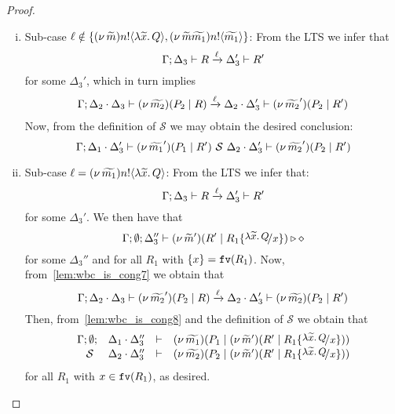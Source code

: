 \begin{proof}
\begin{enumerate}[I.]
\begin{enumerate}[1.]
				\begin{enumerate}[i.]
					\item Sub-case 	$\ell \notin \{(\nu\, \widetilde{m}) n ! \langle \lambda \widetilde{x}.\,Q \rangle, (\nu\, \widetilde{m}\widetilde{m_1}) n ! \langle \widetilde{m_1} \rangle\}$: From the LTS we infer that 
							\[
								\Gamma; \Delta_3 \vdash R \xrightarrow{\ell} \Delta_3' \vdash R'
							\]
						for some $\Delta_3'$, which in turn implies
							\begin{eqnarray*}
								\Gamma; \Delta_2 \cdot \Delta_3 \vdash (\nu\, \widetilde{m_2})(P_2 \;|\; R) \xrightarrow{\ell} \Delta_2 \cdot \Delta_3' \vdash (\nu\, \widetilde{m_2}')(P_2 \;|\; R')
							\end{eqnarray*}
						Now, from the definition of $\mathcal{S}$ we may obtain the desired conclusion:
							\[
								\Gamma; \Delta_1 \cdot \Delta_3' \vdash (\nu\, \widetilde{m_1}')(P_1 \;|\; R') \ \mathcal{S}\  \Delta_2 \cdot \Delta_3' \vdash (\nu\, \widetilde{m_2}')(P_2 \;|\; R')
							\]

				\item	Sub-case $\ell = (\nu\, \widetilde{m_1}) n ! \langle \lambda \widetilde{x}.\,Q \rangle$:
					From the LTS we infer that:
						\begin{equation}
						\Gamma; \Delta_3 \vdash R \xrightarrow{\ell} \Delta_3' \vdash R'
								\label{lem:wbc_is_cong7}
						\end{equation}
						for some $\Delta_3'$. We then have that 
						\begin{equation}
	\Gamma; \emptyset; \Delta_3'' \proves \newsp{\widetilde{m}'}{R' \Par R_1 \subst{\abs{\widetilde{x}}{Q}}{x}} \hastype \Proc
								\label{lem:wbc_is_cong8}
						\end{equation}
						for some $\Delta_3''$ and for all $R_1$ with $\{x\} = \mathtt{fv}(R_1)$. Now, from~\eqref{lem:wbc_is_cong7} we obtain that
						\[
							\Gamma; \Delta_2 \cdot \Delta_3 \vdash (\nu\, \widetilde{m_2}')(P_2 \;|\; R) \xrightarrow{\ell} \Delta_2 \cdot \Delta_3' \vdash (\nu\, \widetilde{m_2})(P_2 \;|\; R')
						\]
						Then, from~\eqref{lem:wbc_is_cong8} and the definition of $\mathcal{S}$ we obtain that						\[
							\mhorel{\Gamma}{\Delta_1 \cat \Delta_3''}{\newsp{\widetilde{m_1}}{P_1 \Par \newsp{\widetilde{m}'}{R' \Par R_1 \subst{\abs{\widetilde{x}}{Q}}{x}}}}
							{\ \mathcal{S}\ }
							{\Delta_2 \cdot \Delta_3''}{}{\newsp{\widetilde{m_2}}{P_2 \Par \newsp{\widetilde{m}'}{R' \Par R_1 \subst{\abs{\widetilde{x}}{Q}}{x}}}}
						\]
						 for all $R_1$ with $x \in \mathtt{fv}(R_1)$, as desired. \\


\end{enumerate}
\end{enumerate}
\end{enumerate}
\end{proof}
